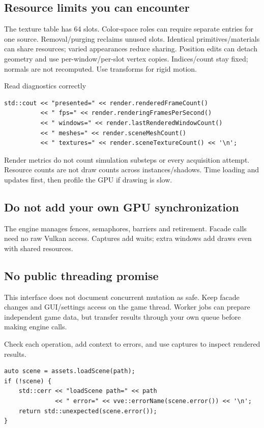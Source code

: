 \documentclass[11pt,a4paper]{article}
\begin{document}
\subsection*{Resource limits you can encounter}
The texture table has 64 slots. Color-space roles can require separate entries for one source. Removal/purging reclaims unused slots. Identical primitives/materials can share resources; varied appearances reduce sharing. Position edits can detach geometry and use per-window/per-slot vertex copies. Indices/count stay fixed; normals are not recomputed. Use transforms for rigid motion.

Read diagnostics correctly

\begin{lstlisting}[language={}]
std::cout << "presented=" << render.renderedFrameCount()
          << " fps=" << render.renderingFramesPerSecond()
          << " windows=" << render.lastRenderedWindowCount()
          << " meshes=" << render.sceneMeshCount()
          << " textures=" << render.sceneTextureCount() << '\n';
\end{lstlisting}

Render metrics do not count simulation substeps or every acquisition attempt. Resource counts are not draw counts across instances/shadows. Time loading and updates first, then profile the GPU if drawing is slow.

\subsection*{Do not add your own GPU synchronization}
The engine manages fences, semaphores, barriers and retirement. Facade calls need no raw Vulkan access. Captures add waits; extra windows add draws even with shared resources.

\subsection*{No public threading promise}
This interface does not document concurrent mutation as safe. Keep facade changes and GUI/settings access on the game thread. Worker jobs can prepare independent game data, but transfer results through your own queue before making engine calls.

\label{core-73}
Check each operation, add context to errors, and use captures to inspect rendered results.

\begin{lstlisting}[language={}]
auto scene = assets.loadScene(path);
if (!scene) {
    std::cerr << "loadScene path=" << path
              << " error=" << vve::errorName(scene.error()) << '\n';
    return std::unexpected(scene.error());
}
\end{lstlisting}
\end{document}
